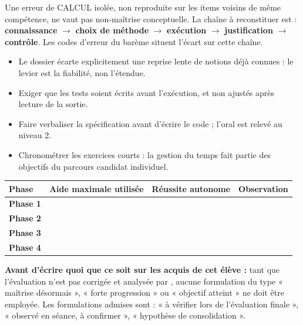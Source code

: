 \documentclass[10pt,a4paper]{article}
\begin{document}
Une erreur de \textsc{CALCUL} isolée, non reproduite sur les items voisins de même compétence, ne vaut pas non-maîtrise conceptuelle. La chaîne à reconstituer est : \textbf{connaissance} $\rightarrow$ \textbf{choix de méthode} $\rightarrow$ \textbf{exécution} $\rightarrow$ \textbf{justification} $\rightarrow$ \textbf{contrôle}. Les codes d'erreur du barème situent l'écart sur cette chaîne.
\begin{itemize}\item Le dossier écarte explicitement une reprise lente de notions déjà connues : le levier est la fiabilité, non l'étendue.\item Exiger que les tests soient écrits avant l'exécution, et non ajustés après lecture de la sortie.\item Faire verbaliser la spécification avant d'écrire le code ; l'oral est relevé au niveau 2.\item Chronométrer les exercices courts : la gestion du temps fait partie des objectifs du parcours candidat individuel.\end{itemize}
\par\noindent\begin{tabularx}{\linewidth}{>{\bfseries}p{26mm} X X X}
\toprule Phase & Aide maximale utilisée & Réussite autonome & Observation \\ \midrule
Phase 1 & & & \\[6mm]
Phase 2 & & & \\[6mm]
Phase 3 & & & \\[6mm]
Phase 4 & & & \\[6mm]
\bottomrule\end{tabularx}
\begin{warningbox}\textbf{Avant d'écrire quoi que ce soit sur les acquis de cet élève :} tant que l'évaluation n'est pas corrigée et analysée par , aucune formulation du type « maîtrise désormais », « forte progression » ou « objectif atteint » ne doit être employée. Les formulations admises sont : « à vérifier lors de l'évaluation finale », « observé en séance, à confirmer », « hypothèse de consolidation ».\end{warningbox}
\end{document}
